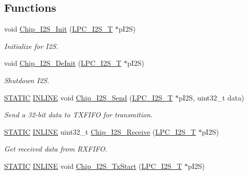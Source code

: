 \subsection*{Functions}
\begin{DoxyCompactItemize}
\item 
void \hyperlink{group___i2_s__18_x_x__43_x_x_ga006752f0240a956ae02fba521e63c053}{Chip\+\_\+\+I2\+S\+\_\+\+Init} (\hyperlink{struct_l_p_c___i2_s___t}{L\+P\+C\+\_\+\+I2\+S\+\_\+T} $\ast$p\+I2S)
\begin{DoxyCompactList}\small\item\em Initialize for I2S. \end{DoxyCompactList}\item 
void \hyperlink{group___i2_s__18_x_x__43_x_x_ga2fbdb14520735214e155253f05a88a0a}{Chip\+\_\+\+I2\+S\+\_\+\+De\+Init} (\hyperlink{struct_l_p_c___i2_s___t}{L\+P\+C\+\_\+\+I2\+S\+\_\+T} $\ast$p\+I2S)
\begin{DoxyCompactList}\small\item\em Shutdown I2S. \end{DoxyCompactList}\item 
\hyperlink{group___l_p_c___types___public___macros_ga10b2d890d871e1489bb02b7e70d9bdfb}{S\+T\+A\+T\+IC} \hyperlink{spifi__18xx__43xx_8h_a2eb6f9e0395b47b8d5e3eeae4fe0c116}{I\+N\+L\+I\+NE} void \hyperlink{group___i2_s__18_x_x__43_x_x_ga7927122545d8ec1879743fb8caffb723}{Chip\+\_\+\+I2\+S\+\_\+\+Send} (\hyperlink{struct_l_p_c___i2_s___t}{L\+P\+C\+\_\+\+I2\+S\+\_\+T} $\ast$p\+I2S, uint32\+\_\+t data)
\begin{DoxyCompactList}\small\item\em Send a 32-\/bit data to T\+X\+F\+I\+FO for transmition. \end{DoxyCompactList}\item 
\hyperlink{group___l_p_c___types___public___macros_ga10b2d890d871e1489bb02b7e70d9bdfb}{S\+T\+A\+T\+IC} \hyperlink{spifi__18xx__43xx_8h_a2eb6f9e0395b47b8d5e3eeae4fe0c116}{I\+N\+L\+I\+NE} uint32\+\_\+t \hyperlink{group___i2_s__18_x_x__43_x_x_ga74005245ee6b79220df6a563db92a04f}{Chip\+\_\+\+I2\+S\+\_\+\+Receive} (\hyperlink{struct_l_p_c___i2_s___t}{L\+P\+C\+\_\+\+I2\+S\+\_\+T} $\ast$p\+I2S)
\begin{DoxyCompactList}\small\item\em Get received data from R\+X\+F\+I\+FO. \end{DoxyCompactList}\item 
\hyperlink{group___l_p_c___types___public___macros_ga10b2d890d871e1489bb02b7e70d9bdfb}{S\+T\+A\+T\+IC} \hyperlink{spifi__18xx__43xx_8h_a2eb6f9e0395b47b8d5e3eeae4fe0c116}{I\+N\+L\+I\+NE} void \hyperlink{group___i2_s__18_x_x__43_x_x_ga84f5b666dcacef8140c1355ed308a782}{Chip\+\_\+\+I2\+S\+\_\+\+Tx\+Start} (\hyperlink{struct_l_p_c___i2_s___t}{L\+P\+C\+\_\+\+I2\+S\+\_\+T} $\ast$p\+I2S)

\end{DoxyCompactItemize}
